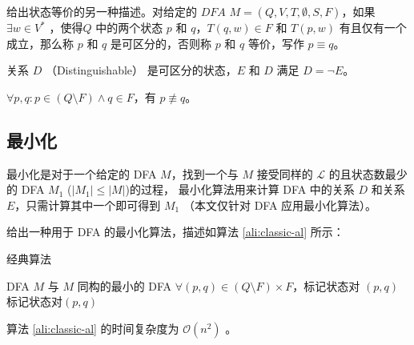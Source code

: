 \begin{definition}
    给出状态等价的另一种描述。对给定的 $DFA$ $M=(Q,V,T,\emptyset,S,F)$，如果 $\exists w \in V^*$ ，使得$Q$ 中的两个状态 $p$ 和 $q$，$T(q,w)\in F$ 和 $T(p,w)$ 有且仅有一个成立，那么称 $p$ 和 $q$ 是可区分的，否则称 $p$ 和 $q$ 等价，写作 $p \equiv q$。
\end{definition}

\begin{remark}
    关系 $D$ （Distinguishable） 是可区分的状态，$E$ 和 $D$ 满足 $D=\lnot E$。
\end{remark}

\begin{remark}
    $\forall p,q: p \in (Q \setminus F) \land q \in F$，有 $ p \not\equiv q $。
\end{remark}

\subsection{最小化}

最小化是对于一个给定的 DFA $M$，找到一个与 $M$ 接受同样的 $\mathcal{L}$ 的且状态数最少的 DFA $M_1$ ($|M_1|\leq |M|$)的过程， 最小化算法用来计算 DFA 中的关系 $D$ 和关系 $E$，只需计算其中一个即可得到 $M_1$ \cite{watson1993taxonomyb}（本文仅针对 DFA 应用最小化算法）。

给出一种用于 DFA 的最小化算法\cite{book1,zf14Min,yingjie2009describing}，描述如算法 \ref{ali:classic-al} 所示：

\begin{algorithm}
    \caption{经典算法}\label{ali:classic-al}
    \begin{algorithmic}[1]
        \Require DFA $M$
        \Ensure 与 $M$ 同构的最小的 DFA
        \Statex
        \State $ \forall (p,q) \in (Q \setminus F) \times F $，标记状态对 $(p,q)$ 
        \Repeat
                        \State 标记状态对$(p,q)$
                    \EndIf
                \EndFor
            \EndFor
    \end{algorithmic}
\end{algorithm}

\begin{theorem}
    算法 \ref{ali:classic-al} 的时间复杂度为 $\mathcal{O}(n^2)$ \cite{yingjie2009describing}。
\end{theorem}


